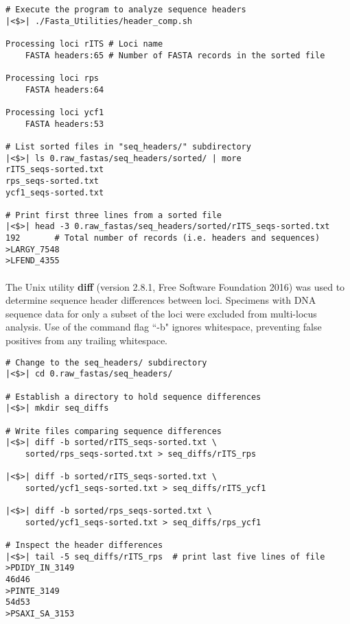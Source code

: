 \vspace*{30pt}

\begin{lstlisting}[caption={Execute \textit{header\_comp.sh} script}]
# Execute the program to analyze sequence headers
|<$>| ./Fasta_Utilities/header_comp.sh      

Processing loci rITS # Loci name
	FASTA headers:65 # Number of FASTA records in the sorted file

Processing loci rps
	FASTA headers:64

Processing loci ycf1
	FASTA headers:53

# List sorted files in "seq_headers/" subdirectory
|<$>| ls 0.raw_fastas/seq_headers/sorted/ | more
rITS_seqs-sorted.txt
rps_seqs-sorted.txt
ycf1_seqs-sorted.txt

# Print first three lines from a sorted file
|<$>| head -3 0.raw_fastas/seq_headers/sorted/rITS_seqs-sorted.txt
192       # Total number of records (i.e. headers and sequences)
>LARGY_7548
>LFEND_4355

\end{lstlisting}

\clearpage

\paragraph{} The Unix utility \textbf{diff} (version 2.8.1, Free Software Foundation 2016) was used to determine sequence header differences between loci.  Specimens with DNA sequence data for only a subset of the loci were excluded from multi-locus analysis.  Use of the command flag ``-b" ignores whitespace, preventing false positives from any trailing whitespace.

\vspace*{30pt}

\begin{lstlisting}[caption=Calculate sequence diffs]
# Change to the seq_headers/ subdirectory
|<$>| cd 0.raw_fastas/seq_headers/

# Establish a directory to hold sequence differences
|<$>| mkdir seq_diffs

# Write files comparing sequence differences
|<$>| diff -b sorted/rITS_seqs-sorted.txt \
    sorted/rps_seqs-sorted.txt > seq_diffs/rITS_rps

|<$>| diff -b sorted/rITS_seqs-sorted.txt \
    sorted/ycf1_seqs-sorted.txt > seq_diffs/rITS_ycf1

|<$>| diff -b sorted/rps_seqs-sorted.txt \
    sorted/ycf1_seqs-sorted.txt > seq_diffs/rps_ycf1

# Inspect the header differences
|<$>| tail -5 seq_diffs/rITS_rps  # print last five lines of file
>PDIDY_IN_3149
46d46
>PINTE_3149
54d53
>PSAXI_SA_3153
\end{lstlisting}

